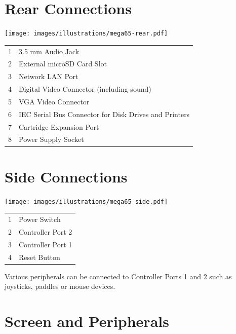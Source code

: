 \newpage
\section{Rear Connections}

\texttt{[image: images/illustrations/mega65-rear.pdf]}
\begin{center}
\begin{longtable}{ c | l}
	1	& 	3.5 mm Audio Jack \\
	2	& 	External microSD Card Slot\\
	3	& 	Network LAN Port \\
	4	& 	Digital Video Connector (including sound) \\
	5	& 	VGA Video Connector \\
	6	& 	IEC Serial Bus Connector for Disk Drives and Printers \\
	7	& 	Cartridge Expansion Port \\
	8	& 	Power Supply Socket \\
\end{longtable}
\end{center}

\vspace{-1cm}

\section{Side Connections}

\texttt{[image: images/illustrations/mega65-side.pdf]}

\begin{center}
\begin{longtable}{ c | l}
	1	& 	Power Switch \\
	2	& 	Controller Port 2 \\
	3	& 	Controller Port 1 \\
	4	& 	Reset Button \\
\end{longtable}
\end{center}

Various peripherals can be connected to Controller Ports 1 and 2 such as joysticks, paddles or mouse devices.

\newpage

\section{Screen and Peripherals}

